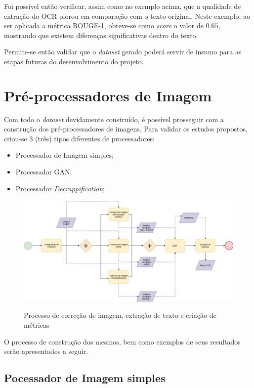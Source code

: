 Foi possível então verificar, assim como no exemplo acima, que a qualidade de extração do OCR piorou em comparação com o texto original. Neste exemplo, ao ser aplicada a métrica ROUGE-1, obteve-se como \textit{score} o valor de $0.65$, mostrando que existem diferenças significativas dentro do texto.

Permite-se então validar que o \textit{dataset} gerado poderá servir de insumo para as etapas futuras do desenvolvimento do projeto.

\section{Pré-processadores de Imagem}

Com todo o \textit{dataset} devidamente construído, é possível prosseguir com a construção dos pré-processadores de imagens. Para validar os estudos propostos, criou-se 3 (três) tipos diferentes de processadores:

\begin{itemize}
  \item Processador de Imagem simples;
  \item Processador GAN;
  \item Processador \textit{Decrappification};
\end{itemize}

\begin{figure}[H]
  \centering
  \caption{Processo de correção de imagem, extração de texto e criação de métricas}
  \includegraphics[scale=.5, angle=270]{figuras/text-extraction-and-comparison-flow.png}
  \label{fig:text-extraction-and-comparison-flow}
\end{figure}

O processo de construção dos mesmos, bem como exemplos de seus resultados serão apresentados a seguir.

\subsection{Pocessador de Imagem simples}


